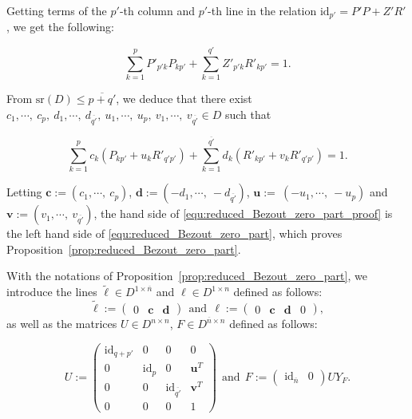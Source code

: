 \documentclass{ifacconf}
\newcommand\g[1]{\textbf{#1}}
\newcommand\id[1]{\text{id}_{#1}}
\newcommand\sr{\text{sr}(D)}
\begin{document}
\begin{pf}
  Getting terms of the $p'$-th column and $p'$-th line in the relation
  $\id{p'}=P'P+Z'R'$, we get the following:
  \medskip
  \begin{small}
    \[\sum_{k=1}^pP'_{p'k}P_{kp'}+\sum_{k=1}^{q'}Z'_{p'k}R'_{kp'}=1.\]
  \end{small}
  \medskip
  From $\sr\leq\overline{p+q'}$, we deduce that there exist $c_1,
  \cdots,\ c_p,\ d_1,\cdots,\ d_{\overline{q'}},\ u_1,\cdots,\ u_p,\ v_1,
  \cdots,\ v_{\overline{q'}}\in D$ such that
  \medskip
  \begin{small}
    \begin{equation}\label{equ:reduced_Bezout_zero_part_proof}
      \sum_{k=1}^pc_k\left(P_{kp'}+u_kR'_{q'p'}\right)+\sum_{k=1}^{
        \overline{q'}}d_k\left(R'_{kp'}+v_kR'_{q'p'}\right)=1.
    \end{equation}
  \end{small}
  \medskip
  Letting $\g{c}:=\left(c_1,\cdots,\ c_p\right)$, $\g{d}:=\left(-d_1,
  \cdots,\ -d_{\overline{q'}}\right)$, $\g{u}:=~\left(-u_1,\cdots,\ -u_p
  \right)$ and $\g{v}:=\left(v_1,\cdots,\ v_{\overline{q'}}\right)$, the
  hand side of \eqref{equ:reduced_Bezout_zero_part_proof} is the left
  hand side of \eqref{equ:reduced_Bezout_zero_part}, which proves
  Proposition~\ref{prop:reduced_Bezout_zero_part}.
\end{pf}

\medskip

With the notations of Proposition~\ref{prop:reduced_Bezout_zero_part},
we introduce the lines $\tilde{\ell}\in D^{1\times\overline{n}}$ and 
$\ell\in D^{1\times n}$ defined as follows:
\medskip
\[\tilde{\ell}:=\begin{pmatrix}
  0 & \g{c} & \g{d}\end{pmatrix}\ \ \text{and}\ \
  \ell:=\begin{pmatrix}
  0 & \g{c} & \g{d} & 0
    \end{pmatrix},
\]
\medskip
as well as the matrices $U\in D^{n\times n}$,
$F\in D^{\overline{n}\times n}$ defined as follows:
\medskip
\begin{small}
  \[U:=\begin{pmatrix}
    \id{q+p'} & 0 & 0 & 0\\
    0 & \id{p} & 0 & \g{u}^T\\
    0 & 0 & \id{\overline{q'}} & \g{v}^T\\
    0 & 0 & 0 & 1
    \end{pmatrix}\ \ \text{and}\ \
    F:=\begin{pmatrix}
    \id{\overline{n}} & 0
    \end{pmatrix}UY_F.
  \]
\end{small}
\medskip
\end{document}

